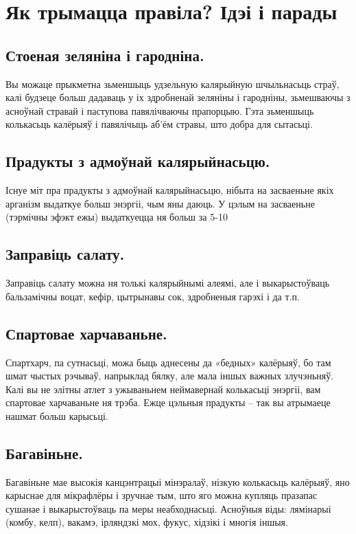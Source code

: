 \section{Як трымацца правіла? Ідэі і парады}

\subsection{Стоеная зеляніна і гародніна.}
Вы можаце прыкметна зьменшыць удзельную калярыйную шчыльнасьць страў, калі будзеце больш дадаваць у іх здробненай зеляніны і гародніны, зьмешваючы з асноўнай стравай і паступова павялічваючы прапорцыю. Гэта зьменшыць колькасьць калёрыяў і павялічыць аб'ём стравы, што добра для сытасьці.

\subsection{Прадукты з адмоўнай калярыйнасьцю.}
Існуе міт пра прадукты з адмоўнай калярыйнасьцю, нібыта на засваеньне якіх арганізм выдаткуе больш энэргіі, чым яны даюць. У цэлым на засваеньне (тэрмічны эфэкт ежы) выдаткуецца ня больш за 5-10%

\subsection{Заправіць салату.}
Заправіць салату можна ня толькі калярыйнымі алеямі, але і выкарыстоўваць бальзамічны воцат, кефір, цытрынавы сок, здробненыя гарэхі і да т.п.

\subsection{Спартовае харчаваньне.}
Спартхарч, па сутнасьці, можа быць аднесены да «бедных» калёрыяў, бо там шмат чыстых рэчываў, напрыклад бялку, але мала іншых важных злучэньняў. Калі вы не элітны атлет з ужываньнем неймавернай колькасьці энэргіі, вам спартовае харчаваньне ня трэба. Ежце цэльныя прадукты – так вы атрымаеце нашмат больш карысьці.

\subsection{Багавіньне.}
Багавіньне мае высокія канцэнтрацыі мінэралаў, нізкую колькасьць калёрыяў, яно карыснае для мікрафлёры і зручнае тым, што яго можна купляць празапас сушанае і выкарыстоўваць па меры неабходнасьці. Асноўныя віды: лямінарыі (комбу, келп), вакамэ, ірляндзкі мох, фукус, хідзікі і многія іншыя.

